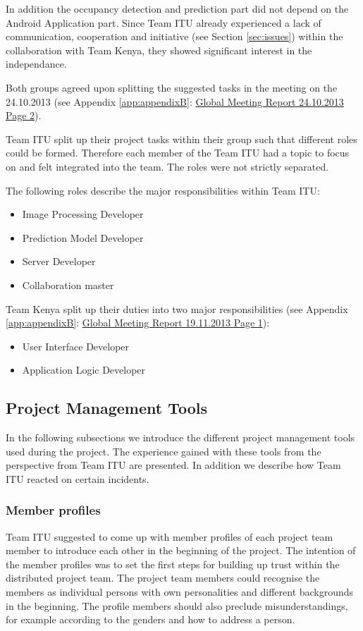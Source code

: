 In addition the occupancy detection and prediction part did not depend on the Android Application part. Since Team ITU already experienced a lack of communication, cooperation and initiative (see Section \ref{sec:issues}) within the collaboration with Team Kenya, they showed significant interest in the independance.

Both groups agreed upon splitting the suggested tasks in the meeting on the 24.10.2013 (see Appendix \ref{app:appendixB}: \hyperlink{GSD20131024.2}{Global Meeting Report 24.10.2013 Page 2}).

Team ITU split up their project tasks within their group such that different roles could be formed. Therefore each member of the Team ITU had a topic to focus on and felt integrated into the team. The roles were not strictly separated.

The following roles describe the major responsibilities within Team ITU:
	\begin{itemize}
		\item Image Processing Developer
		\item Prediction Model Developer
		\item Server Developer
		\item Collaboration master
	\end{itemize}

Team Kenya split up their duties into two major responsibilities (see Appendix \ref{app:appendixB}: \hyperlink{GSD20131119.1}{Global Meeting Report 19.11.2013 Page 1}):
	\begin{itemize}
		\item User Interface Developer
		\item Application Logic Developer
	\end{itemize}



\subsection{Project Management Tools}
\label{sec:tools}
In the following subsections we introduce the different project management tools used during the project. The experience gained with these tools from the perspective from Team ITU are presented. In addition we describe how Team ITU reacted on certain incidents.


\subsubsection {Member profiles}
\label{sec:member_profiles}
Team ITU suggested to come up with member profiles of each project team member to introduce each other in the beginning of the project. The intention of the member profiles was to set the first steps for building up trust within the distributed project team. The project team members could recognise the members as individual persons with own personalities and different backgrounds in the beginning. The profile members should also preclude misunderstandings, for example according to the genders and how to address a person.

